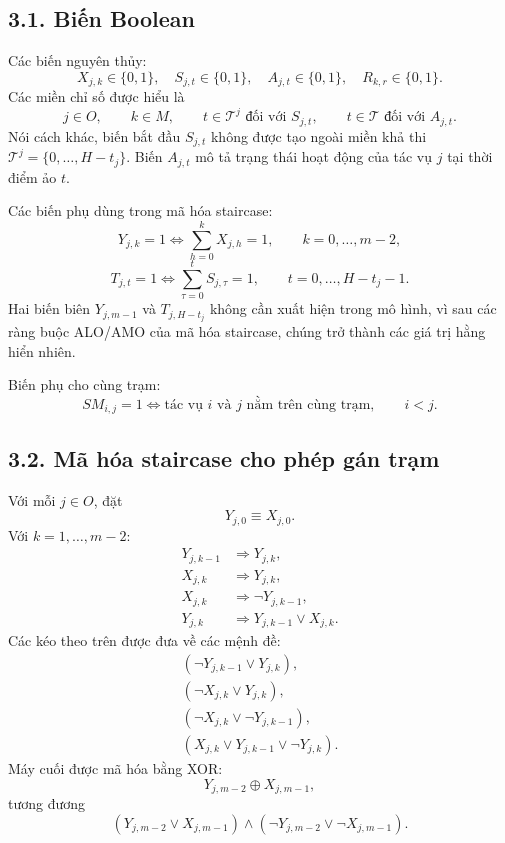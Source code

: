 \documentclass[12pt]{article}
\begin{document}
\subsection*{3.1. Biến Boolean}

Các biến nguyên thủy:
\[
X_{j,k}\in\{0,1\},\quad
S_{j,t}\in\{0,1\},\quad
A_{j,t}\in\{0,1\},\quad
R_{k,r}\in\{0,1\}.
\]
Các miền chỉ số được hiểu là
\[
j\in O,\qquad k\in M,\qquad t\in\mathcal{T}^{j}\text{ đối với }S_{j,t},
\qquad t\in\mathcal{T}\text{ đối với }A_{j,t}.
\]
Nói cách khác, biến bắt đầu $S_{j,t}$ không được tạo ngoài miền khả thi $\mathcal{T}^{j}=\{0,\ldots,H-t_j\}$. Biến $A_{j,t}$ mô tả trạng thái hoạt động của tác vụ $j$ tại thời điểm ảo $t$.

Các biến phụ dùng trong mã hóa staircase:
\[
Y_{j,k}=1
\Longleftrightarrow
\sum_{h=0}^{k}X_{j,h}=1,
\qquad k=0,\ldots,m-2,
\]
\[
T_{j,t}=1
\Longleftrightarrow
\sum_{\tau=0}^{t}S_{j,\tau}=1,
\qquad t=0,\ldots,H-t_j-1.
\]
Hai biến biên $Y_{j,m-1}$ và $T_{j,H-t_j}$ không cần xuất hiện trong mô hình, vì sau các ràng buộc ALO/AMO của mã hóa staircase, chúng trở thành các giá trị hằng hiển nhiên.

Biến phụ cho cùng trạm:
\[
SM_{i,j}=1
\Longleftrightarrow
\text{tác vụ }i\text{ và }j\text{ nằm trên cùng trạm},
\qquad i<j.
\]

\subsection*{3.2. Mã hóa staircase cho phép gán trạm}

Với mỗi $j\in O$, đặt
\[
Y_{j,0}\equiv X_{j,0}.
\]
Với $k=1,\ldots,m-2$:
\begin{align}
Y_{j,k-1} &\Rightarrow Y_{j,k}, \tag{SAT\_1}\\
X_{j,k} &\Rightarrow Y_{j,k}, \tag{SAT\_2}\\
X_{j,k} &\Rightarrow \neg Y_{j,k-1}, \tag{SAT\_3}\\
Y_{j,k} &\Rightarrow Y_{j,k-1}\lor X_{j,k}. \tag{SAT\_4}
\end{align}
Các kéo theo trên được đưa về các mệnh đề:
\begin{align}
(\neg Y_{j,k-1}\lor Y_{j,k}),\\
(\neg X_{j,k}\lor Y_{j,k}),\\
(\neg X_{j,k}\lor \neg Y_{j,k-1}),\\
(X_{j,k}\lor Y_{j,k-1}\lor \neg Y_{j,k}).
\end{align}
Máy cuối được mã hóa bằng XOR:
\[
Y_{j,m-2}\oplus X_{j,m-1},
\]
tương đương
\[
(Y_{j,m-2}\lor X_{j,m-1})
\land
(\neg Y_{j,m-2}\lor \neg X_{j,m-1}).
\]
\end{document}
